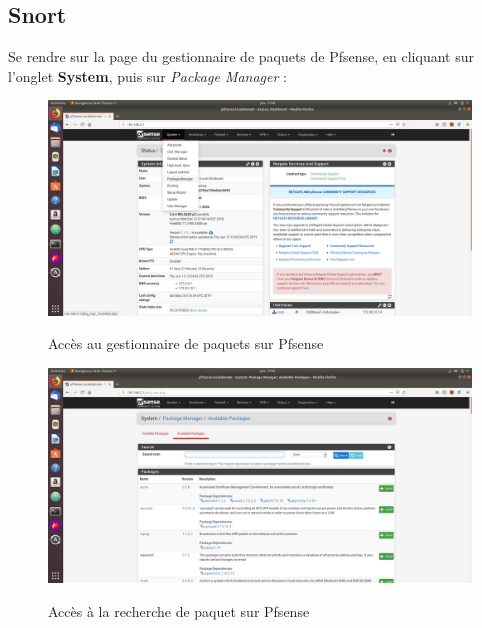 \subsection{Snort}

Se rendre sur la page du gestionnaire de paquets de Pfsense, en cliquant sur l'onglet \textbf{System}, puis sur \textit{Package Manager} :
\begin{figure}[h!]
    \begin{center}
        \includegraphics[scale=0.33]{MISP_Screenshots/Snort/1.png}
        \label{MISP_Screenshots/Snort/1}
        \caption{Accès au gestionnaire de paquets sur Pfsense}
    \end{center}
\end{figure}
\FloatBarrier 
    

\begin{figure}[h!]
    \begin{center}
        \includegraphics[scale=0.33]{MISP_Screenshots/Snort/2.png}
        \label{MISP_Screenshots/Snort/2}
        \caption{Accès à la recherche de paquet sur Pfsense}
    \end{center}
\end{figure}
\FloatBarrier

